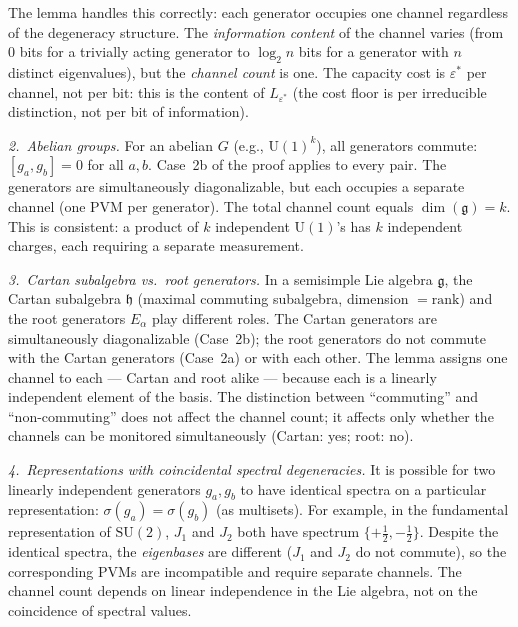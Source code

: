 \documentclass[11pt,a4paper]{article}
\theoremstyle{definition}
\newcommand{\SU}{\mathrm{SU}}
\begin{document}
The lemma handles this correctly: each generator occupies one channel
regardless of the degeneracy structure.  The \emph{information
content} of the channel varies (from 0 bits for a trivially acting
generator to $\log_2 n$ bits for a generator with $n$ distinct
eigenvalues), but the \emph{channel count} is one.  The
capacity cost is $\varepsilon^*$ per channel, not per bit: this is
the content of $L_{\varepsilon^*}$ (the cost floor is per irreducible
distinction, not per bit of information).

\smallskip\noindent\textit{2.\ Abelian groups.}\quad
For an abelian $G$ (e.g., $\mathrm{U}(1)^k$), all generators commute:
$[g_a, g_b] = 0$ for all $a, b$.  Case~2b of the proof applies to
every pair.  The generators are simultaneously diagonalizable, but
each occupies a separate channel (one PVM per generator).  The total
channel count equals $\dim(\mathfrak{g}) = k$.  This is consistent:
a product of $k$ independent $\mathrm{U}(1)$'s has $k$ independent
charges, each requiring a separate measurement.

\smallskip\noindent\textit{3.\ Cartan subalgebra vs.\ root generators.}\quad
In a semisimple Lie algebra $\mathfrak{g}$, the Cartan subalgebra
$\mathfrak{h}$ (maximal commuting subalgebra, dimension $= \mathrm{rank}$)
and the root generators $E_\alpha$ play different roles.  The Cartan
generators are simultaneously diagonalizable (Case~2b); the root
generators do not commute with the Cartan generators (Case~2a) or
with each other.  The lemma assigns one channel to each --- Cartan and
root alike --- because each is a linearly independent element of the
basis.  The distinction between ``commuting'' and ``non-commuting'' does
not affect the channel count; it affects only whether the channels
can be monitored simultaneously (Cartan: yes; root: no).

\smallskip\noindent\textit{4.\ Representations with coincidental
spectral degeneracies.}\quad
It is possible for two linearly independent generators $g_a, g_b$ to
have identical spectra on a particular representation: $\sigma(g_a) =
\sigma(g_b)$ (as multisets).  For example, in the fundamental
representation of $\SU(2)$, $J_1$ and $J_2$ both have spectrum
$\{+\tfrac{1}{2}, -\tfrac{1}{2}\}$.  Despite the identical spectra,
the \emph{eigenbases} are different ($J_1$ and $J_2$ do not commute),
so the corresponding PVMs are incompatible and require separate
channels.  The channel count depends on linear independence in the Lie
algebra, not on the coincidence of spectral values.
\end{document}
